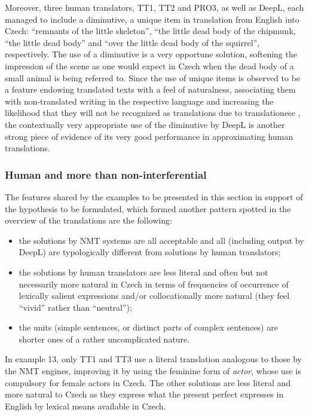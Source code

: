 \documentclass[output=paper]{langscibook}
\begin{document}
Moreover, three human translators, TT1, TT2 and PRO3, as well as DeepL, each managed to include a diminutive, a unique item in translation from English into Czech: “remnants of the little skeleton”, “the little dead body of the chipmunk, “the little dead body” and “over the little dead body of the squirrel”, respectively. The use of a diminutive is a very opportune solution, softening the impression of the scene as one would expect in Czech when the dead body of a small animal is being referred to. Since the use of unique items is observed to be a feature endowing translated texts with a feel of naturalness, associating them with non-translated writing in the respective language and increasing the likelihood that they will not be recognized as translations due to translationese \citep{Tirkkonen-Condit2004}, the contextually very appropriate use of the diminutive by DeepL is another strong piece of evidence of its very good performance in approximating human translations.

\subsubsection{ Human and more than non-interferential}\label{sec:kamenicka:4.2.2}

The features shared by the examples to be presented in this section in support of the hypothesis to be formulated, which formed another pattern spotted in the overview of the translations are the following:

\begin{itemize}
\item the solutions by NMT systems are all acceptable and all (including output by DeepL) are typologically different from solutions by human translators;
\item the solutions by human translators are less literal and often but not necessarily more natural in Czech in terms of frequencies of occurrence of lexically salient expressions and/or collocationally more natural (they feel “vivid” rather than “neutral”);
\item the units (simple sentences, or distinct parts of complex sentences) are shorter ones of a rather uncomplicated nature.
\end{itemize}

In example 13, only TT1 and TT3 use a literal translation analogous to those by the NMT engines, improving it by using the feminine form of \textit{actor}, whose use is compulsory for female actors in Czech. The other solutions are less literal and more natural to Czech as they express what the present perfect expresses in English by lexical means available in Czech.
\end{document}
